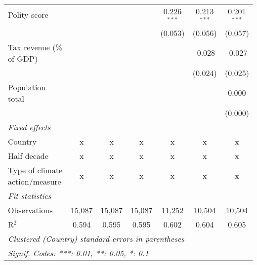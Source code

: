 \begin{tabular}{lcccccc}
   Polity score                                                           &         &                &                & 0.226$^{***}$  & 0.213$^{***}$  & 0.201$^{***}$\\   
                                                                          &         &                &                & (0.053)        & (0.056)        & (0.057)\\   
   Tax revenue (\% of GDP)                                                &         &                &                &                & -0.028         & -0.027\\   
                                                                          &         &                &                &                & (0.024)        & (0.025)\\   
   Population total                                                       &         &                &                &                &                & 0.000\\   
                                                                          &         &                &                &                &                & (0.000)\\   
   \emph{Fixed effects}\\
   Country                                                                & x       & x              & x              & x              & x              & x\\  
   Half decade                                                            & x       & x              & x              & x              & x              & x\\  
   Type of climate action/measure                                         & x       & x              & x              & x              & x              & x\\  
   \midrule \emph{Fit statistics}\\
   Observations                                                           & 15,087  & 15,087         & 15,087         & 11,252         & 10,504         & 10,504\\  
   R$^2$                                                                  & 0.594   & 0.595          & 0.595          & 0.602          & 0.604          & 0.605\\  
   \midrule
   \multicolumn{7}{l}{\emph{Clustered (Country) standard-errors in parentheses}}\\
   \multicolumn{7}{l}{\emph{Signif. Codes: ***: 0.01, **: 0.05, *: 0.1}}\\
\end{tabular}
\par\endgroup


